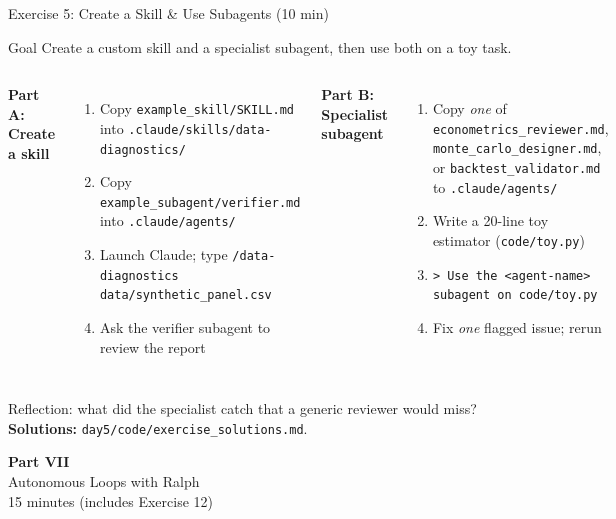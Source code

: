 \documentclass[aspectratio=169,10pt]{beamer}
\newcommand{\emphc}[1]{\textcolor{harvardcrimson}{#1}}
\begin{document}
\begin{frame}[fragile]{Exercise 5: Create a Skill \& Use Subagents {\small(10 min)}}
\scriptsize
\begin{exampleblock}{Goal}
Create a custom skill and a specialist subagent, then use both on a toy task.
\end{exampleblock}

\vspace{0.2em}
\begin{columns}[T]
\textbf{Part A: Create a skill}
\begin{enumerate}\itemsep0pt
    \item Copy \texttt{example\_skill/SKILL.md} into \texttt{.claude/skills/data-diagnostics/}
    \item Copy \texttt{example\_subagent/verifier.md} into \texttt{.claude/agents/}
    \item Launch Claude; type \texttt{/data-diagnostics data/synthetic\_panel.csv}
    \item Ask the verifier subagent to review the report
\end{enumerate}

\textbf{Part B: Specialist subagent}
\begin{enumerate}\itemsep0pt
    \item Copy \emph{one} of \texttt{econometrics\_reviewer.md}, \texttt{monte\_carlo\_designer.md}, or \texttt{backtest\_validator.md} to \texttt{.claude/agents/}
    \item Write a 20-line toy estimator (\texttt{code/toy.py})
    \item \texttt{> Use the <agent-name> subagent on code/toy.py}
    \item Fix \emph{one} flagged issue; rerun
\end{enumerate}
\end{columns}

\vspace{0.2em}
\emphc{Reflection:} what did the specialist catch that a generic reviewer would miss?
\textbf{Solutions:} \texttt{day5/code/exercise\_solutions.md}.
\end{frame}


\begin{frame}{}
\vfill
\begin{center}
{\Huge \textcolor{uzhblue}{\textbf{Part VII}}}\\[12pt]
{\LARGE Autonomous Loops with Ralph}\\[6pt]
{\small 15 minutes (includes Exercise 12)}
\end{center}
\vfill
\end{frame}
\end{document}
